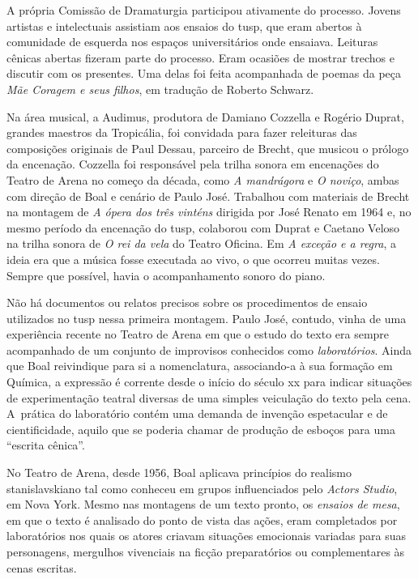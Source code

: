 A própria Comissão de Dramaturgia participou ativamente do processo.
Jovens artistas e intelectuais assistiam aos ensaios do {\sc tusp}, que eram
abertos à comunidade de esquerda nos espaços universitários onde
ensaiava. Leituras cênicas abertas fizeram parte do processo. Eram
ocasiões de mostrar trechos e discutir com os presentes. Uma delas foi
feita acompanhada de poemas da peça {\it Mãe Coragem e seus filhos}, em
tradução de Roberto Schwarz.

Na área musical, a Audimus, produtora de Damiano Cozzella e Rogério
Duprat, grandes maestros da Tropicália, foi convidada para fazer
releituras das composições originais de Paul Dessau, parceiro de Brecht,
que musicou o prólogo da encenação. Cozzella foi responsável pela trilha
sonora em encenações do Teatro de Arena no começo da década, como {\it A
mandrágora} e {\it O noviço}, ambas com direção de Boal e cenário de
Paulo José. Trabalhou com materiais de Brecht na montagem de {\it A
ópera dos três vinténs} dirigida por José Renato em 1964 e, no mesmo
período da encenação do {\sc tusp}, colaborou com Duprat e Caetano Veloso na
trilha sonora de {\it O rei da vela} do Teatro Oficina. Em {\it A
exceção e a regra}, a ideia era que a música fosse executada ao vivo, o que
ocorreu muitas vezes. Sempre que possível, havia o acompanhamento
sonoro do piano.

\subject{Ensaios e laboratórios}

Não há documentos ou relatos precisos sobre os procedimentos de ensaio
utilizados no {\sc tusp} nessa primeira montagem. Paulo José, contudo, vinha
de uma experiência recente no Teatro de Arena em que o estudo do texto
era sempre acompanhado de um conjunto de improvisos conhecidos como
{\it laboratórios}. Ainda que Boal reivindique para si a
nomenclatura, associando-a à sua formação em Química, a expressão é
corrente desde o início do século {\sc xx} para indicar situações de
experimentação teatral diversas de uma simples veiculação do texto pela
cena. A~prática do laboratório contém uma demanda de invenção
espetacular e de cientificidade, aquilo que se poderia chamar de produção
de esboços para uma “escrita cênica”.

No Teatro de Arena, desde 1956, Boal aplicava princípios do realismo
stanislavskiano tal como conheceu em grupos influenciados pelo
{\it Actors Studio}, em Nova York. Mesmo nas montagens de um texto
pronto, os {\it ensaios de mesa}, em que o texto é analisado do
ponto de vista das ações, eram completados por laboratórios nos quais
os atores criavam situações emocionais variadas para suas personagens,
mergulhos vivenciais na ficção preparatórios ou complementares às cenas
escritas.

